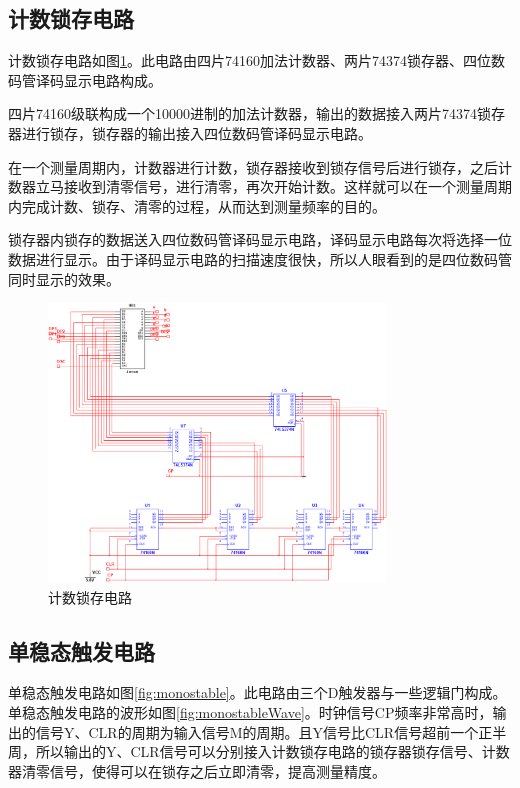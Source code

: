 \documentclass[12pt]{article}
\begin{document}
\subsection{计数锁存电路}

计数锁存电路如图\ref*{fig:countLatch}。此电路由四片74160加法计数器、两片74374锁存器、四位数码管译码显示电路构成。

四片74160级联构成一个10000进制的加法计数器，输出的数据接入两片74374锁存器进行锁存，锁存器的输出接入四位数码管译码显示电路。

在一个测量周期内，计数器进行计数，锁存器接收到锁存信号后进行锁存，之后计数器立马接收到清零信号，进行清零，再次开始计数。这样就可以在一个测量周期内完成计数、锁存、清零的过程，从而达到测量频率的目的。

锁存器内锁存的数据送入四位数码管译码显示电路，译码显示电路每次将选择一位数据进行显示。由于译码显示电路的扫描速度很快，所以人眼看到的是四位数码管同时显示的效果。

\begin{figure}[H]
    \centering
    \includegraphics[width=0.8\textwidth]{./fig/countLatch.png}
    \caption{计数锁存电路}
    \label{fig:countLatch}
\end{figure}

\subsection{单稳态触发电路}

单稳态触发电路如图\ref*{fig:monostable}。此电路由三个D触发器与一些逻辑门构成。单稳态触发电路的波形如图\ref*{fig:monostableWave}。时钟信号CP频率非常高时，输出的信号Y、CLR的周期为输入信号M的周期。且Y信号比CLR信号超前一个正半周，所以输出的Y、CLR信号可以分别接入计数锁存电路的锁存器锁存信号、计数器清零信号，使得可以在锁存之后立即清零，提高测量精度。
\end{document}

